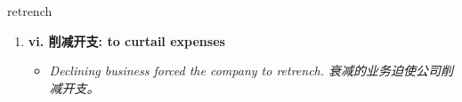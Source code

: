 
\begin{frame}
{\huge retrench}
\begin{center}
\begin{enumerate}\Large
  \item \textbf{vi. 削减开支: to curtail expenses}
  \begin{itemize}
    \item \em{\Large{Declining business forced the company to retrench. 衰减的业务迫使公司削减开支。}}
  \end{itemize}
\end{enumerate}
\end{center}
\end{frame}
